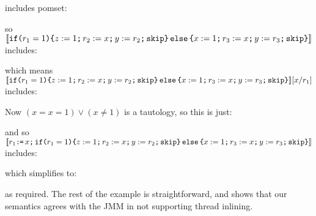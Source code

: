 includes pomset:
\begin{tikzdisplay}[node distance=1em]
\end{tikzdisplay}
so  $\sem{\IF{r_1 = 1} \THEN z := 1\SEMI r_2 := x\SEMI y := r_2\SEMI \SKIP \ELSE x := 1\SEMI r_3 := x\SEMI y := r_3\SEMI \SKIP \FI}$ includes:
\begin{tikzdisplay}[node distance=1em]
\end{tikzdisplay}
which means $\sem{\IF{r_1 = 1} \THEN z := 1\SEMI r_2 := x\SEMI y := r_2\SEMI \SKIP \ELSE x := 1\SEMI r_3 := x\SEMI y := r_3\SEMI \SKIP \FI}[x/r_1]$ includes:
\begin{tikzdisplay}[node distance=1em]
\end{tikzdisplay}
Now $(x=x=1) \lor (x\neq1)$ is a tautology, so this is just:
\begin{tikzdisplay}[node distance=1em]
\end{tikzdisplay}
and so $\sem{r_1 \GETS x\SEMI \IF{r_1 = 1} \THEN z := 1\SEMI r_2 := x\SEMI y := r_2\SEMI \SKIP \ELSE x := 1\SEMI r_3 := x\SEMI y := r_3\SEMI \SKIP \FI}$ includes:
\begin{tikzdisplay}[node distance=1em]
\end{tikzdisplay}
which simplifies to:
\begin{tikzdisplay}[node distance=1em]
\end{tikzdisplay}
as required. The rest of the example is straightforward, and shows that our semantics
agrees with the JMM in not supporting thread inlining.



